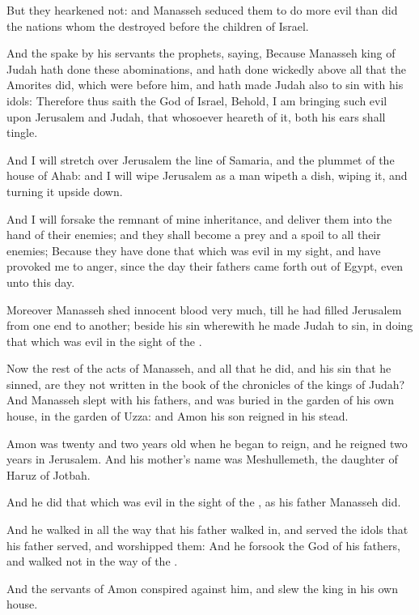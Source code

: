 \Verse But they hearkened not: and Manasseh seduced them to do more evil than did the nations whom the \LORD destroyed before the children of Israel.

\Verse And the \LORD spake by his servants the prophets, saying, \Verse Because Manasseh king of Judah hath done these abominations, and hath done wickedly above all that the Amorites did, which were before him, and hath made Judah also to sin with his idols: \Verse Therefore thus saith the \LORD God of Israel, Behold, I am bringing such evil upon Jerusalem and Judah, that whosoever heareth of it, both his ears shall tingle.

\Verse And I will stretch over Jerusalem the line of Samaria, and the plummet of the house of Ahab: and I will wipe Jerusalem as a man wipeth a dish, wiping it, and turning it upside down.

\Verse And I will forsake the remnant of mine inheritance, and deliver them into the hand of their enemies; and they shall become a prey and a spoil to all their enemies; \Verse Because they have done that which was evil in my sight, and have provoked me to anger, since the day their fathers came forth out of Egypt, even unto this day.

\Verse Moreover Manasseh shed innocent blood very much, till he had filled Jerusalem from one end to another; beside his sin wherewith he made Judah to sin, in doing that which was evil in the sight of the \LORD.

\Verse Now the rest of the acts of Manasseh, and all that he did, and his sin that he sinned, are they not written in the book of the chronicles of the kings of Judah?  \Verse And Manasseh slept with his fathers, and was buried in the garden of his own house, in the garden of Uzza: and Amon his son reigned in his stead.

\Verse Amon was twenty and two years old when he began to reign, and he reigned two years in Jerusalem. And his mother's name was Meshullemeth, the daughter of Haruz of Jotbah.

\Verse And he did that which was evil in the sight of the \LORD, as his father Manasseh did.

\Verse And he walked in all the way that his father walked in, and served the idols that his father served, and worshipped them: \Verse And he forsook the \LORD God of his fathers, and walked not in the way of the \LORD.

\Verse And the servants of Amon conspired against him, and slew the king in his own house.

